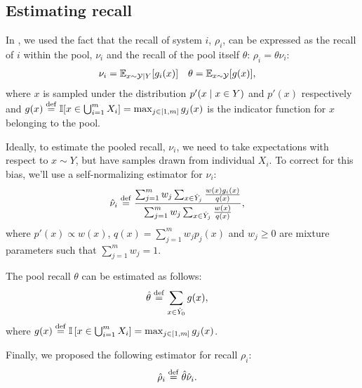 \subsection{Estimating recall}

In , we used the fact that the recall of system $i$, $\rho_i$, can be expressed as the recall of $i$ within the pool, $\nu_i$ and the recall of the pool itself $\theta$: $\rho_i = \theta \nu_i$:  
\begin{align*}
  \nu_i &= \mathbb{E}_{x \sim \mathcal{Y} \mid Y}[g_i(x)] &
  \theta &= \mathbb{E}_{x \sim \mathcal{Y}}[g(x)],
\end{align*}
where $x$ is sampled under the distribution $p'(x \mid x \in Y)$ and $p'(x)$ respectively and
  $g(x) \stackrel{\rm def}{=} \mathbb{I}[x \in \bigcup_{i=1}^m X_i] = \max_{j \in [1,m]} g_j(x)$ is the indicator function for $x$ belonging to the pool.

Ideally, to estimate the pooled recall, $\nu_i$, we need to take expectations with respect to $x \sim Y$, but have samples drawn from individual $X_i$.
To correct for this bias, we'll use a self-normalizing estimator for $\nu_i$:
\begin{align*}
  {\hat{\nu}}_i &\stackrel{\rm def}{=} \frac{\sum_{j=1}^m w_j \sum_{x \in {\hat{Y}}_j} \frac{w(x) g_i(x)}{q(x)}}{\sum_{j=1}^m w_j \sum_{x \in {\hat{Y}}_j} \frac{w(x)}{q(x)}},
\end{align*}
where $p'(x) \propto w(x)$, $q(x) = \sum_{j=1}^m w_{j} p_j(x)$ and $w_{j} \ge 0$ are mixture parameters such that $\sum_{j=1}^m w_{j} = 1$.

The pool recall $\theta$ can be estimated as follows:
\begin{align*}
  {\hat{\theta}} &\stackrel{\rm def}{=} \sum_{x \in {\hat{Y}}_0} g(x),
\end{align*}
where $g(x) \stackrel{\rm def}{=} \mathbb{I}\left[ x \in \bigcup_{i=1}^m X_i \right] = \max_{j \in [1,m]} g_j(x)$.

Finally, we proposed the following estimator for recall $\rho_i$:
\begin{align*}
  {\hat{\rho}}_i &\stackrel{\rm def}{=} {\hat{\theta}}{\hat{\nu}}_i.
\end{align*}

